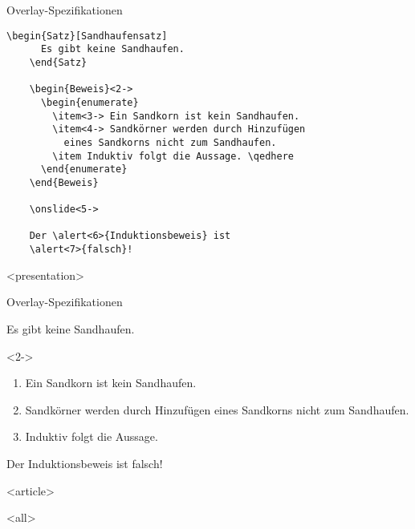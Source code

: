 \begin{Frame}[fragile]{Overlay-Spezifikationen}
  \begin{lstlisting}[gobble=4]
    \begin{Satz}[Sandhaufensatz]
      Es gibt keine Sandhaufen.
    \end{Satz}

    \begin{Beweis}<2->
      \begin{enumerate}
        \item<3-> Ein Sandkorn ist kein Sandhaufen.
        \item<4-> Sandkörner werden durch Hinzufügen
          eines Sandkorns nicht zum Sandhaufen.
        \item Induktiv folgt die Aussage. \qedhere
      \end{enumerate}
    \end{Beweis}

    \onslide<5->

    Der \alert<6>{Induktionsbeweis} ist
    \alert<7>{falsch}!
  \end{lstlisting}
\end{Frame}

\mode
<presentation>

\begin{Frame}{Overlay-Spezifikationen}
  \begin{Satz}[Sandhaufensatz]
    Es gibt keine Sandhaufen.
  \end{Satz}

  \begin{Beweis}<2->
    \begin{enumerate}
      \item<3-> Ein Sandkorn ist kein Sandhaufen.
      \item<4-> Sandkörner werden durch Hinzufügen
        eines Sandkorns nicht zum Sandhaufen.
      \item Induktiv folgt die Aussage. \qedhere
    \end{enumerate}
  \end{Beweis}


  Der \alert<6>{Induktionsbeweis} ist
  \alert<7>{falsch}!
\end{Frame}

\mode
<article>

\frame{}

\mode
<all>

